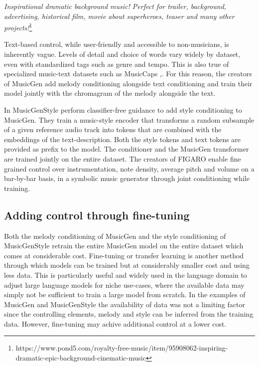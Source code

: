 \textit{Inspirational dramatic background music! Perfect for trailer, background, advertising, historical film, movie about superheroes, teaser and many other projects!}\footnote{ https://www.pond5.com/royalty-free-music/item/95908062-inspiring-dramatic-epic-background-cinematic-music
}

Text-based control, while user-friendly and accessible to non-musicians, is inherently vague. Levels of detail and choice of words vary widely by dataset, even with standardized tags such as genre and tempo. This is also true of specialized music-text datasets such as MusicCaps \cite{Agostinelli_Denk_Borsos_Engel_Verzetti_Caillon_Huang_Jansen_Roberts_Tagliasacchi_et_al._2023},\cite{Lee_Doh_Jeong_2023_subjectivity_musiccaps}. For this reason, the creators of MusicGen \cite{copet2023simple} add melody conditioning alongside text conditioning and train their model jointly with the chromagram of the melody alongside the text. 

In MusicGenStyle \cite{Rouard_Adi_Copet_Roebel_Défossez_musicgenstyle_2024} perform classifier-free guidance to add style conditioning to MusicGen. They train a music-style encoder that transforms a random subsample of a given reference audio track into tokens that are combined with the embeddings of the text-description. Both the style tokens and text tokens are provided as prefix to the model. The conditioner and the MusicGen transformer are trained jointly on the entire dataset. 
The creators of FIGARO\cite{Rütte_figaro_2023} enable fine grained control over instrumentation, note density, average pitch and volume on a bar-by-bar basis, in a symbolic music generator through joint conditioning while training. 

\subsection{Adding control through fine-tuning}

Both the melody conditioning of MusicGen \cite{copet2023simple} and the style conditioning of MusicGenStyle \cite{Rouard_Adi_Copet_Roebel_Défossez_musicgenstyle_2024} retrain the entire MusicGen model on the entire dataset which comes at considerable cost. Fine-tuning or transfer learning is another method through which models can be trained but at considerably smaller cost and using less data. This is particularly useful and widely used in the language domain to adjust large language models for niche use-cases, where the available data may simply not be sufficient to train a large model from scratch. In the examples of MusicGen and MusicGenStyle the availability of data was not a limiting factor since the controlling elements, melody and style can be inferred from the training data. However, fine-tuning may achive additional control at a lower cost. 

